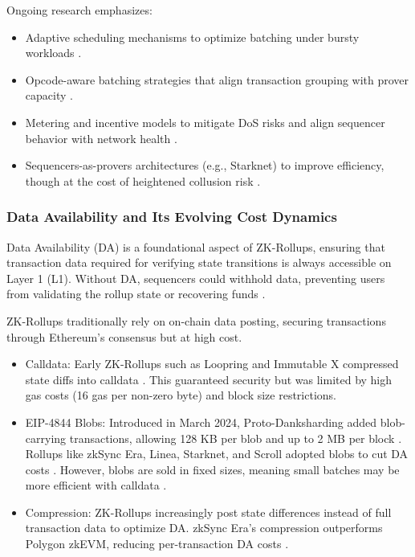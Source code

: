 
Ongoing research emphasizes:
\vspace{12pt}
\begin{itemize}
\item  Adaptive scheduling mechanisms to optimize batching under bursty workloads \cite{chaliasos2024analyzing}.
\item Opcode-aware batching strategies that align transaction grouping with prover capacity \cite{chaliasos2024analyzing}.
\item Metering and incentive models to mitigate DoS risks and align sequencer behavior with network health \cite{chaliasos2024pricing}.
\item Sequencers-as-provers architectures (e.g., Starknet) to improve efficiency, though at the cost of heightened collusion risk \cite{motepalli2023sok}.
\end{itemize}

\subsubsection{Data Availability and Its Evolving Cost Dynamics}
\vspace{12pt}
Data Availability (DA) is a foundational aspect of ZK-Rollups, ensuring that transaction data required for verifying state transitions is always accessible on Layer 1 (L1). Without DA, sequencers could withhold data, preventing users from validating the rollup state or recovering funds \cite{saif2024survey}.


ZK-Rollups traditionally rely on on-chain data posting, securing transactions through Ethereum’s consensus but at high cost.
\vspace{12pt}

\begin{itemize}
\item Calldata: Early ZK-Rollups such as Loopring and Immutable X compressed state diffs into calldata \cite{gogol2025scalingdefi}. This guaranteed security but was limited by high gas costs (16 gas per non-zero byte) and block size restrictions.
\item EIP-4844 Blobs: Introduced in March 2024, Proto-Danksharding added blob-carrying transactions, allowing 128 KB per blob and up to 2 MB per block \cite{gogol2025scalingdefi}. Rollups like zkSync Era, Linea, Starknet, and Scroll adopted blobs to cut DA costs \cite{gogol2025scalingdefi}. However, blobs are sold in fixed sizes, meaning small batches may be more efficient with calldata \cite{gogol2025scalingdefi}.
\item Compression: ZK-Rollups increasingly post state differences instead of full transaction data to optimize DA. zkSync Era’s compression outperforms Polygon zkEVM, reducing per-transaction DA costs \cite{gogol2025scalingdefi}.
\end{itemize}

